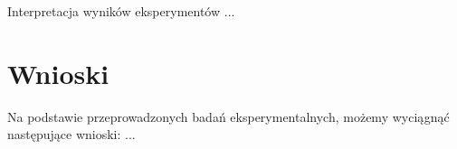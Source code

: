 Interpretacja wyników eksperymentów ...


\section{Wnioski}
\label{sec:wnioski}

Na podstawie przeprowadzonych badań eksperymentalnych, możemy wyciągnąć następujące wnioski: ...

